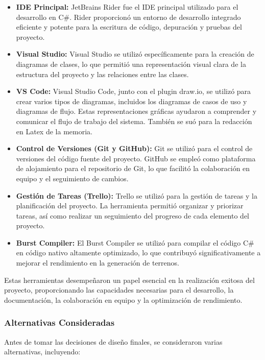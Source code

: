\begin{itemize}
    \item \textbf{IDE Principal:} JetBrains Rider fue el IDE principal utilizado para el desarrollo en C\#. Rider proporcionó un entorno de desarrollo integrado eficiente y potente para la escritura de código, depuración y pruebas del proyecto.
    
    \item \textbf{Visual Studio:} Visual Studio se utilizó específicamente para la creación de diagramas de clases, lo que permitió una representación visual clara de la estructura del proyecto y las relaciones entre las clases.
    
    \item \textbf{VS Code:} Visual Studio Code, junto con el plugin draw.io, se utilizó para crear varios tipos de diagramas, incluidos los diagramas de casos de uso y diagramas de flujo. Estas representaciones gráficas ayudaron a comprender y comunicar el flujo de trabajo del sistema. También se suó para la redacción en Latex de la memoria.
        
    \item \textbf{Control de Versiones (Git y GitHub):} Git se utilizó para el control de versiones del código fuente del proyecto. GitHub se empleó como plataforma de alojamiento para el repositorio de Git, lo que facilitó la colaboración en equipo y el seguimiento de cambios.
    
    \item \textbf{Gestión de Tareas (Trello):} Trello se utilizó para la gestión de tareas y la planificación del proyecto. La herramienta permitió organizar y priorizar tareas, así como realizar un seguimiento del progreso de cada elemento del proyecto.
    
    \item \textbf{Burst Compiler:} El Burst Compiler se utilizó para compilar el código C\# en código nativo altamente optimizado, lo que contribuyó significativamente a mejorar el rendimiento en la generación de terrenos.
\end{itemize}

Estas herramientas desempeñaron un papel esencial en la realización exitosa del proyecto, proporcionando las capacidades necesarias para el desarrollo, la documentación, la colaboración en equipo y la optimización de rendimiento.

\subsubsection{Alternativas Consideradas}
Antes de tomar las decisiones de diseño finales, se consideraron varias alternativas, incluyendo:

